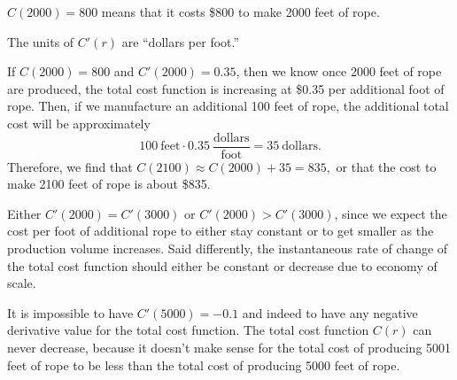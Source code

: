 \begin{activitySolution}
\ba
	\item $C(2000) = 800$ means that it costs \$800 to make 2000 feet of rope.

	\item The units of $C'(r)$ are ``dollars per foot.''

	\item If $C(2000) = 800$ and $C'(2000) = 0.35$, then we know once 2000 feet of rope are produced, the total cost function is increasing at \$0.35 per additional foot of rope.  Then, if we manufacture an additional 100 feet of rope, the additional total cost will be approximately 
	$$100 \ \mbox{feet} \cdot 0.35 \ \frac{\mbox{dollars}}{\mbox{foot}} = 35 \ \mbox{dollars}.$$  
	Therefore, we find that $C(2100) \approx C(2000) + 35 = 835,$ or that the cost to make 2100 feet of rope is about \$835.

	\item Either $C'(2000) = C'(3000)$ or $C'(2000) > C'(3000)$, since we expect the cost per foot of additional rope to either stay constant or to get smaller as the production volume increases.  Said differently, the instantaneous rate of change of the total cost function should either be constant or decrease due to economy of scale.

	\item It is impossible to have $C'(5000) = -0.1$ and indeed to have any negative derivative value for the total cost function.  The total cost function $C(r)$ can never decrease, because it doesn't make sense for the total cost of producing 5001 feet of rope to be less than the total cost of producing 5000 feet of rope. 
\ea
\end{activitySolution}
\aftera